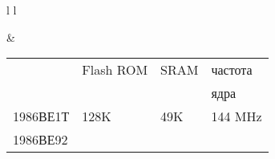 \pagebreak
{}

\begin{tabular}{l l}

\mbox{}

&

\begin{tabular}{l l l l}
& Flash ROM & SRAM & частота \\
&&& ядра \\
\hline
1986ВЕ1Т & 128K & 49K & 144 MHz\\
1986ВЕ92 & & \\
\end{tabular}

\\

\end{tabular}

